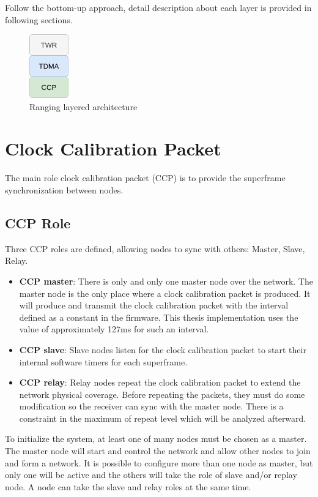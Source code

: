 \documentclass[\main/thesis.tex]{subfiles}
\begin{document}
Follow the bottom-up approach, detail description about each layer is provided in following sections.
\begin{figure}[H]
    \begin{center}
        \includegraphics[width=0.15\textwidth]{ranging_layered_architecture}
    \end{center}
    \caption{Ranging layered architecture}
    \label{fig:ranging_layered_architecture}
\end{figure}

\section{Clock Calibration Packet}
The main role clock calibration packet (CCP) is to provide the superframe synchronization between nodes. 
\subsection{CCP Role}
Three CCP roles are defined, allowing nodes to sync with others: Master, Slave, Relay.
\begin{itemize}
    \item \textbf{CCP master}: There is only and only one master node over the network. The master node is the only place where a clock calibration packet is produced. It will produce and transmit the clock calibration packet with the interval defined as a constant in the firmware. This thesis implementation uses the value of approximately 127ms for such an interval. 
    \item \textbf{CCP slave}: Slave nodes listen for the clock calibration packet to start their internal software timers for each superframe.
    \item \textbf{CCP relay}: Relay nodes repeat the clock calibration packet to extend the network physical coverage. Before repeating the packets, they must do some modification so the receiver can sync with the master node. There is a constraint in the maximum of repeat level which will be analyzed afterward.
\end{itemize}

To initialize the system, at least one of many nodes must be chosen as a master. The master node will start and control the network and allow other nodes to join and form a network. It is possible to configure more than one node as master, but only one will be active and the others will take the role of slave and/or replay node. A node can take the slave and relay roles at the same time.
\end{document}
